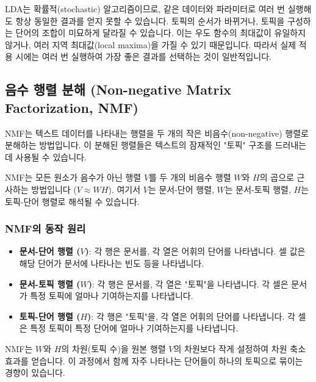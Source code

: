\documentclass[11pt,a4paper]{article}
\theoremstyle{definition}
\begin{document}
\begin{tcolorbox}[caution={LDA의 확률적 특성}]
LDA는 확률적(stochastic) 알고리즘이므로, 같은 데이터와 파라미터로 여러 번 실행해도 항상 동일한 결과를 얻지 못할 수 있습니다. 토픽의 순서가 바뀌거나, 토픽을 구성하는 단어의 조합이 미묘하게 달라질 수 있습니다. 이는 우도 함수의 최대값이 유일하지 않거나, 여러 지역 최대값(local maxima)을 가질 수 있기 때문입니다. 따라서 실제 적용 시에는 여러 번 실행하여 가장 좋은 결과를 선택하는 것이 일반적입니다.
\end{tcolorbox}

\newpage
\subsection{음수 행렬 분해 (Non-negative Matrix Factorization, NMF)}
NMF는 텍스트 데이터를 나타내는 행렬을 두 개의 작은 비음수(non-negative) 행렬로 분해하는 방법입니다. 이 분해된 행렬들은 텍스트의 잠재적인 "토픽" 구조를 드러내는 데 사용될 수 있습니다.

\begin{tcolorbox}[definition={NMF의 기본 개념}]
NMF는 모든 원소가 음수가 아닌 행렬 $V$를 두 개의 비음수 행렬 $W$와 $H$의 곱으로 근사하는 방법입니다 ($V \approx WH$). 여기서 $V$는 문서-단어 행렬, $W$는 문서-토픽 행렬, $H$는 토픽-단어 행렬로 해석될 수 있습니다.
\end{tcolorbox}

\subsubsection{NMF의 동작 원리}
\begin{itemize}
    \item \textbf{문서-단어 행렬 ($V$)}: 각 행은 문서를, 각 열은 어휘의 단어를 나타냅니다. 셀 값은 해당 단어가 문서에 나타나는 빈도 등을 나타냅니다.
    \item \textbf{문서-토픽 행렬 ($W$)}: 각 행은 문서를, 각 열은 "토픽"을 나타냅니다. 각 셀은 문서가 특정 토픽에 얼마나 기여하는지를 나타냅니다.
    \item \textbf{토픽-단어 행렬 ($H$)}: 각 행은 "토픽"을, 각 열은 어휘의 단어를 나타냅니다. 각 셀은 특정 토픽이 특정 단어에 얼마나 기여하는지를 나타냅니다.
\end{itemize}
NMF는 $W$와 $H$의 차원(토픽 수)을 원본 행렬 $V$의 차원보다 작게 설정하여 차원 축소 효과를 얻습니다. 이 과정에서 함께 자주 나타나는 단어들이 하나의 토픽으로 묶이는 경향이 있습니다.
\end{document}
